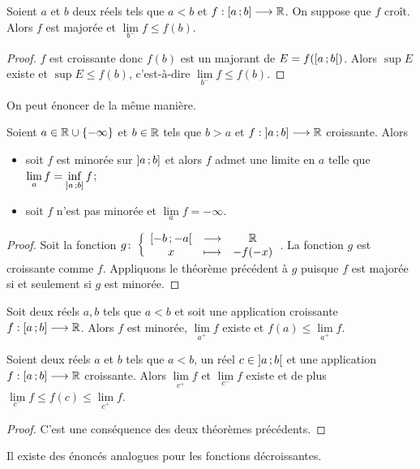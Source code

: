 \begin{theo}
  Soient $a$ et $b$ deux réels tels que $a < b$ et $f:\left[ a \, ;  b \right] \longrightarrow \mathbb{R}$. On suppose que $f$ croît. Alors $f$ est majorée et $\lim\limits_{b^{-}}f \leq f(b)$.
\end{theo}
\begin{proof}
  $f$ est croissante donc $f(b)$ est un majorant de $E=f(\left[ a \, ;  b \right[)$. Alors $\sup E$ existe et $\sup E \leq f(b)$, c'est-à-dire $\lim\limits_{b^{-}}f \leq f(b)$.
\end{proof}
On peut énoncer de la même manière.
\begin{theo}
  Soient $a \in \mathbb{R}\cup \{-\infty\}$ et $b \in \mathbb{R}$ tels que $b > a$ et $f:\left] a \, ;  b \right] \longrightarrow \mathbb{R}$ croissante. Alors
  \begin{itemize}
  \item soit $f$ est minorée sur $\left] a \, ;  b \right]$ et alors $f$ admet une limite en $a$ telle que $\lim\limits_{a} f = \inf\limits_{\left] a \, ;  b \right]}f$;
  \item soit $f$ n'est pas minorée et $\lim\limits_{a} f = -\infty$.
  \end{itemize}
\end{theo}
\begin{proof}
  Soit la fonction $g\colon \left\{\begin{array}{ccc} \left[ -b \, ;  -a \right[ & \longrightarrow &\mathbb{R}\\ x & \longmapsto & -f(-x) \end{array} \right.$. La fonction $g$ est croissante comme $f$. Appliquons le théorème précédent à $g$ puisque $f$ est majorée si et seulement si $g$ est minorée.
\end{proof}
\begin{theo}
  Soit deux réels $a,b$ tels que $a < b$ et soit une application croissante $f:\left[ a \, ;  b \right] \longrightarrow \mathbb{R}$. Alors $f$ est minorée, $\lim\limits_{a^{+}} f$ existe et $f(a) \leq \lim\limits_{a^{+}} f$.
\end{theo}
\begin{cor}
  Soient deux réels $a$ et $b$ tels que $a < b$, un réel $c \in \left] a \, ;  b \right[$ et une application $f :\left[ a \, ;  b \right] \longrightarrow \mathbb{R}$ croissante. Alors $\lim\limits_{c^{+}} f$ et $\lim\limits_{c^{-}} f$ existe et de plus $\lim\limits_{c^{-}} f \leq f(c) \leq \lim\limits_{c^{+}} f$.
\end{cor}
\begin{proof}
  C'est une conséquence des deux théorèmes précédents.
\end{proof}

Il existe des énoncés analogues pour les fonctions décroissantes.

